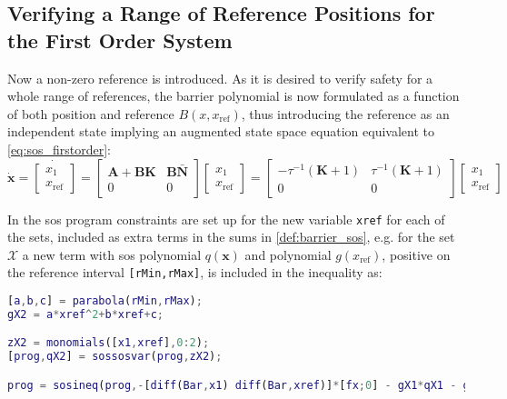 \subsection{Verifying a Range of Reference Positions for the First Order System}\label{sec:sos_1storder_references}

\vspace{-2mm}
Now a non-zero reference is introduced. As it is desired to verify safety for a whole range of references, the barrier polynomial is now formulated as a function of both position and reference $B(x,x_\text{ref})$, thus introducing the reference as an independent state implying an augmented state space equation equivalent to \autoref{eq:sos_firstorder}: 
\begin{equation}
\dot{\mathbf{x}}=\dot{\begin{bmatrix}
x_1\\x_\text{ref}
\end{bmatrix}} 
= \begin{bmatrix}
\mathbf{A}+\textbf{BK} & \textbf{B}\bar{\mathbf{N}}\\
0 & 0
\end{bmatrix}
\begin{bmatrix}
x_1\\x_\text{ref}
\end{bmatrix}
= \begin{bmatrix}
-\tau^{-1}(\mathbf{K}+1) & \tau^{-1}(\mathbf{K}+1)\\
0 & 0
\end{bmatrix}
\begin{bmatrix}
x_1\\x_\text{ref}
\end{bmatrix}
\label{eq:1storder_augmented}
\end{equation}

In the \gls{sos} program constraints are set up for the new variable \texttt{xref}  for each of the sets, included as extra terms in the sums in \autoref{def:barrier_sos}, e.g. for the set $\mathcal{X}$ a new term with \gls{sos} polynomial $q(\mathbf{x})$ and polynomial $g(x_\text{ref})$, positive on the  reference  interval \texttt{[rMin,rMax]}, is included in the inequality as:
\begin{lstlisting}[language=matlab]
% Constraint on the set X being nonpositive for the interval of references 
[a,b,c] = parabola(rMin,rMax); 
gX2 = a*xref^2+b*xref+c;

zX2 = monomials([x1,xref],0:2);
[prog,qX2] = sossosvar(prog,zX2);

prog = sosineq(prog,-[diff(Bar,x1) diff(Bar,xref)]*[fx;0] - gX1*qX1 - gX2*qX2);
\end{lstlisting}

